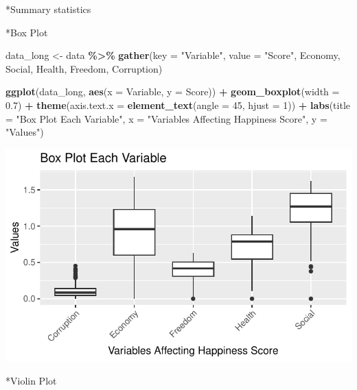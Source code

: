 \documentclass[
  11pt,
]{article}
\newenvironment{Shaded}{\begin{snugshade}}{\end{snugshade}}
\newcommand{\AttributeTok}[1]{\textcolor[rgb]{0.13,0.29,0.53}{#1}}
\newcommand{\DecValTok}[1]{\textcolor[rgb]{0.00,0.00,0.81}{#1}}
\newcommand{\FloatTok}[1]{\textcolor[rgb]{0.00,0.00,0.81}{#1}}
\newcommand{\FunctionTok}[1]{\textcolor[rgb]{0.13,0.29,0.53}{\textbf{#1}}}
\newcommand{\NormalTok}[1]{#1}
\newcommand{\OtherTok}[1]{\textcolor[rgb]{0.56,0.35,0.01}{#1}}
\newcommand{\SpecialCharTok}[1]{\textcolor[rgb]{0.81,0.36,0.00}{\textbf{#1}}}
\newcommand{\StringTok}[1]{\textcolor[rgb]{0.31,0.60,0.02}{#1}}
\begin{document}
*Summary statistics

*Box Plot

\begin{Shaded}
\begin{Highlighting}[]
\NormalTok{data\_long }\OtherTok{\textless{}{-}}\NormalTok{ data }\SpecialCharTok{\%\textgreater{}\%}
  \FunctionTok{gather}\NormalTok{(}\AttributeTok{key =} \StringTok{"Variable"}\NormalTok{, }\AttributeTok{value =} \StringTok{"Score"}\NormalTok{, Economy, Social, Health,}
\NormalTok{         Freedom, Corruption) }

\FunctionTok{ggplot}\NormalTok{(data\_long, }\FunctionTok{aes}\NormalTok{(}\AttributeTok{x =}\NormalTok{ Variable, }\AttributeTok{y =}\NormalTok{ Score)) }\SpecialCharTok{+}
  \FunctionTok{geom\_boxplot}\NormalTok{(}\AttributeTok{width =} \FloatTok{0.7}\NormalTok{) }\SpecialCharTok{+} 
  \FunctionTok{theme}\NormalTok{(}\AttributeTok{axis.text.x =} \FunctionTok{element\_text}\NormalTok{(}\AttributeTok{angle =} \DecValTok{45}\NormalTok{, }\AttributeTok{hjust =} \DecValTok{1}\NormalTok{)) }\SpecialCharTok{+}
  \FunctionTok{labs}\NormalTok{(}\AttributeTok{title =} \StringTok{"Box Plot Each Variable"}\NormalTok{,}
       \AttributeTok{x =} \StringTok{"Variables Affecting Happiness Score"}\NormalTok{, }\AttributeTok{y =} \StringTok{"Values"}\NormalTok{)}
\end{Highlighting}
\end{Shaded}

\begin{center}\includegraphics[width=0.7\linewidth]{Group_project_2_files/figure-latex/unnamed-chunk-20-1} \end{center}

*Violin Plot
\end{document}
